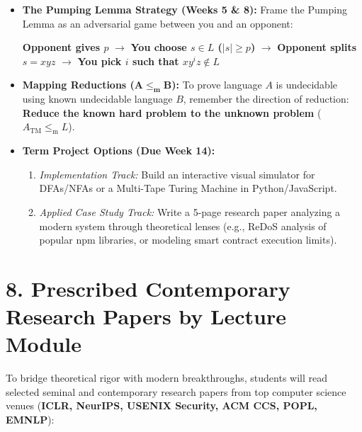 \documentclass[11pt,a4paper]{article}
\begin{document}
\begin{tcolorbox}[title=Mastering Theoretical Proofs]
\begin{itemize}[label=\small$\rightarrow$, leftmargin=1.2em, itemsep=4pt]
    \item \textbf{The Pumping Lemma Strategy (Weeks 5 \& 8):} Frame the Pumping Lemma as an adversarial game between you and an opponent:
    \begin{center}
        \small\textbf{Opponent gives $p$} $\longrightarrow$ \textbf{You choose $s \in L$ ($|s| \ge p$)} $\longrightarrow$ \textbf{Opponent splits $s=xyz$} $\longrightarrow$ \textbf{You pick $i$ such that $xy^iz \notin L$}
    \end{center}

    \item \textbf{Mapping Reductions ($\mathbf{A \le_{\text{m}} B}$):} To prove language $A$ is undecidable using known undecidable language $B$, remember the direction of reduction: \textbf{Reduce the known hard problem to the unknown problem} ($A_{\text{TM}} \le_{\text{m}} L$).

    \item \textbf{Term Project Options (Due Week 14):}
    \begin{enumerate}[label=(\alph*), leftmargin=1.5em]
        \item \textit{Implementation Track:} Build an interactive visual simulator for DFAs/NFAs or a Multi-Tape Turing Machine in Python/JavaScript.
        \item \textit{Applied Case Study Track:} Write a 5-page research paper analyzing a modern system through theoretical lenses (e.g., ReDoS analysis of popular npm libraries, or modeling smart contract execution limits).
    \end{enumerate}
\end{itemize}
\end{tcolorbox}

\section*{8. Prescribed Contemporary Research Papers by Lecture Module}

To bridge theoretical rigor with modern breakthroughs, students will read selected seminal and contemporary research papers from top computer science venues (\textbf{ICLR, NeurIPS, USENIX Security, ACM CCS, POPL, EMNLP}):
\end{document}
